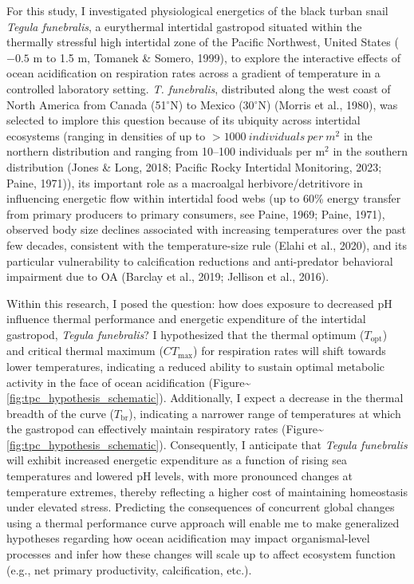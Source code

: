 \documentclass{CSUNthesis}
\begin{document}
For this study, I investigated physiological energetics of the black turban snail \textit{Tegula funebralis}, a eurythermal intertidal gastropod situated within the thermally stressful high intertidal zone of the Pacific Northwest, United States (\(-0.5\) m to 1.5 m, Tomanek \& Somero, 1999), to explore the interactive effects of ocean acidification on respiration rates across a gradient of temperature in a controlled laboratory setting. \textit{T. funebralis}, distributed along the west coast of North America from Canada (51\(^\circ\)N) to Mexico (30\(^\circ\)N) (Morris et al., 1980), was selected to implore this question because of its ubiquity across intertidal ecosystems (ranging in densities of up to \(>1000~individuals~per~m^2\) in the northern distribution and ranging from 10--100 individuals per m\(^2\) in the southern distribution (Jones \& Long, 2018; Pacific Rocky Intertidal Monitoring, 2023; Paine, 1971)), its important role as a macroalgal herbivore/detritivore in influencing energetic flow within intertidal food webs (up to 60\% energy transfer from primary producers to primary consumers, see Paine, 1969; Paine, 1971), observed body size declines associated with increasing temperatures over the past few decades, consistent with the temperature-size rule (Elahi et al., 2020), and its particular vulnerability to calcification reductions and anti-predator behavioral impairment due to OA (Barclay et al., 2019; Jellison et al., 2016).

Within this research, I posed the question: how does exposure to decreased pH influence thermal performance and energetic expenditure of the intertidal gastropod, \textit{Tegula funebralis}? I hypothesized that the thermal optimum (\(T_{\text{opt}}\)) and critical thermal maximum (\(CT_{\text{max}}\)) for respiration rates will shift towards lower temperatures, indicating a reduced ability to sustain optimal metabolic activity in the face of ocean acidification (Figure\textasciitilde{}\ref{fig:tpc_hypothesis_schematic}). Additionally, I expect a decrease in the thermal breadth of the curve (\(T_{\text{br}}\)), indicating a narrower range of temperatures at which the gastropod can effectively maintain respiratory rates (Figure\textasciitilde{}\ref{fig:tpc_hypothesis_schematic}). Consequently, I anticipate that \textit{Tegula funebralis} will exhibit increased energetic expenditure as a function of rising sea temperatures and lowered pH levels, with more pronounced changes at temperature extremes, thereby reflecting a higher cost of maintaining homeostasis under elevated stress. Predicting the consequences of concurrent global changes using a thermal performance curve approach will enable me to make generalized hypotheses regarding how ocean acidification may impact organismal-level processes and infer how these changes will scale up to affect ecosystem function (e.g., net primary productivity, calcification, etc.).
\end{document}
